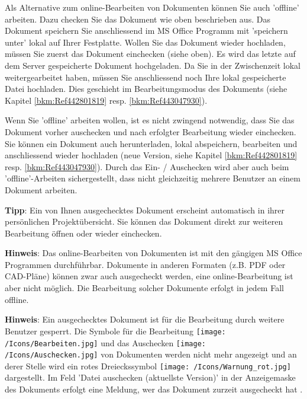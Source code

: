 Als Alternative zum online-Bearbeiten von Dokumenten können Sie auch 'offline' arbeiten. Dazu checken Sie das Dokument wie oben beschrieben aus. Das Dokument speichern Sie anschliessend im MS Office Programm mit 'speichern unter' lokal auf Ihrer Festplatte. Wollen Sie das Dokument wieder hochladen, müssen Sie
zuerst das Dokument einchecken (siehe oben). Es wird das letzte auf dem Server gespeicherte Dokument hochgeladen. Da Sie in der Zwischenzeit lokal weitergearbeitet haben, müssen Sie anschliessend noch Ihre lokal gespeicherte Datei hochladen. Dies geschieht im Bearbeitungsmodus des Dokuments (siehe Kapitel \ref{bkm:Ref442801819} resp. \ref{bkm:Ref443047930}). \newline

Wenn Sie 'offline' arbeiten wollen, ist es nicht zwingend notwendig, dass Sie das Dokument vorher auschecken und nach erfolgter Bearbeitung wieder einchecken. Sie können ein Dokument auch herunterladen, lokal abspeichern, bearbeiten und anschliessend wieder hochladen (neue Version, siehe Kapitel \ref{bkm:Ref442801819} resp. \ref{bkm:Ref443047930}). Durch das Ein- / Auschecken wird aber auch beim 'offline'-Arbeiten sichergestellt, dass nicht gleichzeitig mehrere Benutzer an einem Dokument arbeiten. 

\vspace{\baselineskip}

\textbf{Tipp}: Ein von Ihnen ausgechecktes Dokument erscheint automatisch in ihrer persönlichen Projektübersicht. Sie können das Dokument direkt zur weiteren Bearbeitung öffnen oder wieder einchecken. \newline

\textbf{Hinweis}: Das online-Bearbeiten von Dokumenten ist mit den gängigen MS Office Programmen durchführbar. Dokumente in anderen Formaten (z.B. PDF oder CAD-Pläne) können zwar auch ausgecheckt werden, eine online-Bearbeitung ist aber nicht möglich. Die Bearbeitung solcher Dokumente erfolgt in jedem Fall offline. \newline

\textbf{Hinweis}: Ein ausgechecktes Dokument ist für die Bearbeitung durch weitere Benutzer gesperrt. Die Symbole für die Bearbeitung \texttt{[image: /Icons/Bearbeiten.jpg]} und das Auschecken \texttt{[image: /Icons/Auschecken.jpg]} von Dokumenten werden nicht mehr angezeigt und an derer Stelle wird ein rotes Dreieckssymbol \texttt{[image: /Icons/Warnung\_rot.jpg]}  dargestellt. Im Feld 'Datei auschecken (aktuellste Version)' in der Anzeigemaske des Dokuments erfolgt eine Meldung, wer das Dokument zurzeit ausgecheckt hat .

